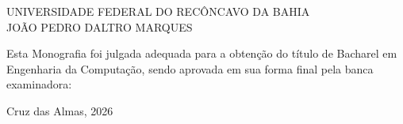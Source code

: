 
%
% 
%
\begin{folhadeaprovacao}


\begin{center}


            {UNIVERSIDADE FEDERAL DO RECÔNCAVO DA BAHIA} \\
           

    \vspace{1.5cm}
                                    {JOÃO PEDRO DALTRO MARQUES}\\
    \bfseries{}
\end{center}

Esta Monografia foi julgada adequada para a obten\c{c}\~{a}o do título de Bacharel em Engenharia da Computação, sendo aprovada em sua forma final pela banca examinadora:

    \vspace{2.5cm}

    \vspace{3 cm}%

    \begin{center}
        Cruz das Almas, 2026
    \end{center}
  
\end{folhadeaprovacao}